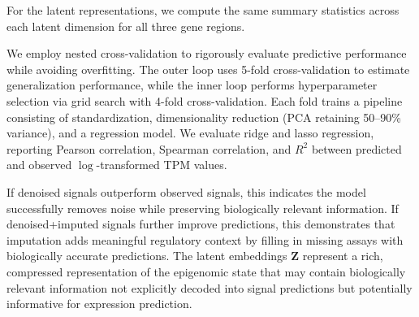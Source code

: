 For the latent representations, we compute the same summary statistics across each latent dimension for all three gene regions.

We employ nested cross-validation to rigorously evaluate predictive performance while avoiding overfitting. The outer loop uses 5-fold cross-validation to estimate generalization performance, while the inner loop performs hyperparameter selection via grid search with 4-fold cross-validation. Each fold trains a pipeline consisting of standardization, dimensionality reduction (PCA retaining 50--90\% variance), and a regression model. We evaluate ridge and lasso regression, reporting Pearson correlation, Spearman correlation, and $R^2$ between predicted and observed $\log$-transformed TPM values.

If denoised signals outperform observed signals, this indicates the model successfully removes noise while preserving biologically relevant information. If denoised+imputed signals further improve predictions, this demonstrates that imputation adds meaningful regulatory context by filling in missing assays with biologically accurate predictions. The latent embeddings $\mathbf{Z}$ represent a rich, compressed representation of the epigenomic state that may contain biologically relevant information not explicitly decoded into signal predictions but potentially informative for expression prediction.

